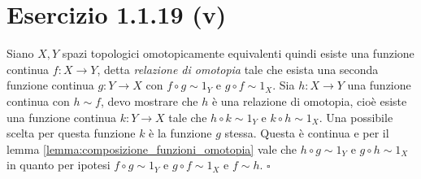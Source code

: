 \documentclass[10pt]{scrartcl}
\begin{document}
\section*{Esercizio 1.1.19 (v)}
Siano $ X, Y $ spazi topologici omotopicamente equivalenti quindi
esiste una funzione continua $ f \colon X \to Y $, detta
\emph{relazione di omotopia} tale che esista una seconda
funzione continua $ g \colon Y \to X $ con $ f \circ g \sim 1_Y $
e $ g \circ f \sim 1_X $. Sia $ h \colon X \to Y $ una funzione
continua con $ h \sim f $, devo mostrare che $ h $ è una
relazione di omotopia, cioè esiste una funzione continua
$ k \colon Y \to X $ tale che $ h \circ k \sim 1_Y $ e $ k \circ h \sim 1_X $.
Una possibile scelta per questa funzione $ k $ è la funzione
$ g $ stessa. Questa è continua e per il lemma \ref{lemma:composizione_funzioni_omotopia}
vale che $ h \circ g \sim 1_Y $ e $ g \circ h \sim 1_X $ in quanto per
ipotesi  $ f \circ g \sim 1_Y $ e $ g \circ f \sim 1_X $ e $ f \sim h $.
\hfill $ \square $

\end{document}
